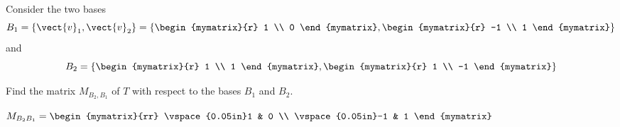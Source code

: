 \begin{enumialphparenastyle}
\begin{ex}
Consider the two bases
\[
B_1 = \left\{ \vect{v}_{1}, \vect{v}_{2} \right\} = \left\{ \begin{mymatrix}{r}
1 \\
0
\end{mymatrix}, \begin{mymatrix}{r}
-1 \\
1
\end{mymatrix}
\right\}
\]
 and 
\[
B_2 = \left\{ \begin{mymatrix}{r}
1 \\
1
\end{mymatrix}, \begin{mymatrix}{r}
1 \\
-1
\end{mymatrix}
\right\}
\]

Find the matrix $M_{B_2,B_1}$ of $T$ with respect to the bases $B_1$ and $B_2$. 
\begin{sol}
$
M_{B_{2} B_{1}} = \begin{mymatrix}{rr}
\vspace{0.05in}1 & 0 \\
\vspace{0.05in}-1 & 1 
\end{mymatrix} $
\end{sol}
\end{ex}

\end{enumialphparenastyle}